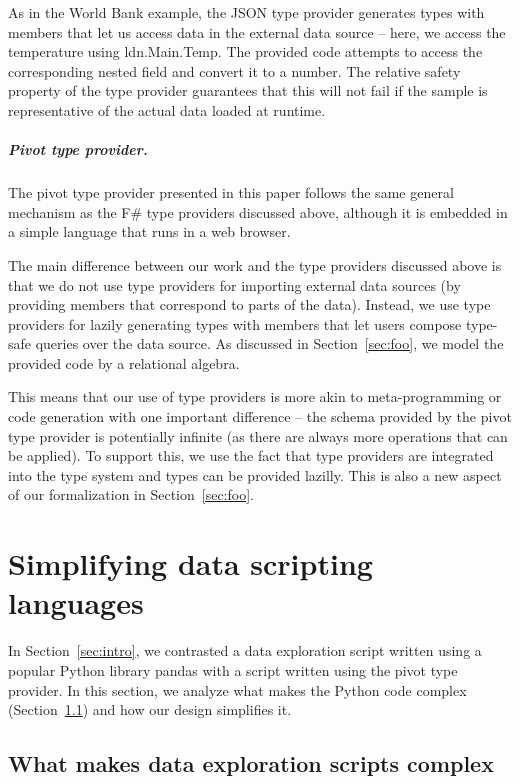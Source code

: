 \documentclass[a4paper,UKenglish]{lipics-v2016}
\theoremstyle{plain}
\theoremstyle{definition}
\newcommand{\ident}[1]{\textnormal{\sffamily #1}}
\begin{document}
\noindent
As in the World Bank example, the JSON type provider generates types with members that let us access
data in the external data source -- here, we access the temperature using \ident{ldn.Main.Temp}. 
The provided code attempts to access the corresponding nested field and convert it to a number.
The relative safety property of the type provider guarantees that this will not fail if the sample 
is representative of the actual data loaded at runtime.
    
\subparagraph{Pivot type provider.} The pivot type provider presented in this paper follows the 
same general mechanism as the F\# type providers discussed above, although it is embedded in a 
simple language that runs in a web browser. 

The main difference between our work and the type providers discussed above is that we do not use
type providers for importing external data sources (by providing members that correspond to parts 
of the data). Instead, we use type providers for lazily generating types with members that let 
users compose type-safe queries over the data source. As discussed in Section~\ref{sec:foo}, we 
model the provided code by a relational algebra.

This means that our use of type providers is more akin to meta-programming or code generation with
one important difference -- the schema provided by the pivot type provider is potentially infinite
(as there are always more operations that can be applied). To support this, we use the fact that
type providers are integrated into the type system and types can be provided lazilly. This is 
also a new aspect of our formalization in Section~\ref{sec:foo}.


\section{Simplifying data scripting languages}
\label{sec:analysis}

In Section~\ref{sec:intro}, we contrasted a data exploration script written using a popular Python 
library pandas with a script written using the pivot type provider. In this section, we analyze 
what makes the Python code complex (Section~\ref{sec:analysis-why}) and how our design simplifies it.

\subsection{What makes data exploration scripts complex}
\label{sec:analysis-why}
\end{document}
